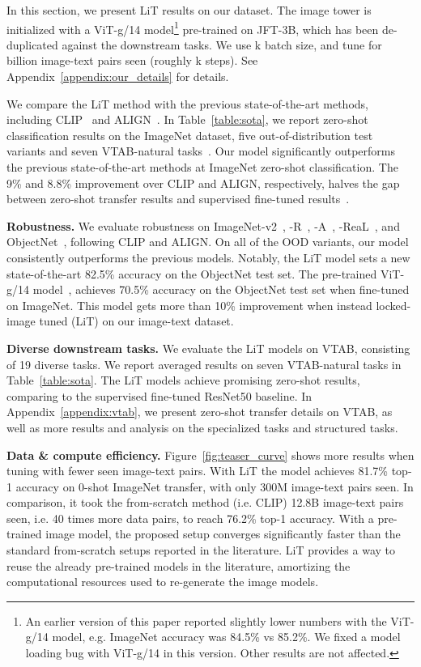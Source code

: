 \documentclass[10pt,twocolumn,letterpaper]{article}
\makeatletter
\def \lit {LiT\xspace}
\renewcommand*{\ie}{i.e.\@\xspace}
\def\objsota{82.5}
\makeatother
\begin{document}
In this section, we present \lit{} results on our dataset.
The image tower is initialized with a ViT-g/14 model\footnote{An earlier version of this paper reported slightly lower numbers with the ViT-g/14 model, e.g. ImageNet accuracy was 84.5\% vs 85.2\%. We fixed a model loading bug with ViT-g/14 in this version. Other results are not affected.} pre-trained on JFT-3B\cite{vitg}, which has been de-duplicated against the downstream tasks. 
We use k batch size, and tune for  billion image-text pairs seen (roughly k steps). See Appendix~\ref{appendix:our_details} for details.

We compare the LiT method with the previous state-of-the-art methods, including CLIP~\cite{clip} and ALIGN~\cite{align}. 
In Table~\ref{table:sota}, we report zero-shot classification results on the ImageNet dataset, five out-of-distribution test variants and seven VTAB-natural tasks~\cite{vtab}.
Our model significantly outperforms the previous state-of-the-art methods at ImageNet zero-shot classification.
The 9\% and  8.8\% improvement over CLIP and ALIGN, respectively, halves the gap between zero-shot transfer results and supervised fine-tuned results~\cite{vitg,coatnet}.

\textbf{Robustness.}
We evaluate robustness on ImageNet-v2~\cite{imagenet_v2}, -R~\cite{imagenet_r,imagenet_sketch}, -A~\cite{imagenet_a}, -ReaL~\cite{imagenet_real}, and ObjectNet~\cite{objectnet}, following CLIP and ALIGN. 
On all of the OOD variants, our model consistently outperforms the previous models. 
Notably, the \lit{} model sets a new state-of-the-art \objsota{}\% accuracy on the ObjectNet test set.
The pre-trained ViT-g/14 model~\cite{vitg}, achieves 70.5\% accuracy on the ObjectNet test set when fine-tuned on ImageNet.
This model gets more than 10\% improvement when instead locked-image tuned (LiT) on our image-text dataset.

\textbf{Diverse downstream tasks.}
We evaluate the LiT models on VTAB, consisting of 19 diverse tasks.
We report averaged results on seven VTAB-natural tasks in Table~\ref{table:sota}. The LiT models achieve promising zero-shot results, comparing to the supervised fine-tuned ResNet50 baseline. 
In Appendix~\ref{appendix:vtab}, we present zero-shot transfer details on VTAB, as well as more results and analysis on the specialized tasks and structured tasks.

\textbf{Data \& compute efficiency.} Figure~\ref{fig:teaser_curve} shows more results when tuning with fewer seen image-text pairs. 
With \lit{} the model achieves 81.7\% top-1 accuracy on 0-shot ImageNet transfer, with only 300M image-text pairs seen.
In comparison, it took the from-scratch method (\ie CLIP) 12.8B image-text pairs seen, \ie 40 times more data pairs, to reach 76.2\% top-1 accuracy. 
With a pre-trained image model, the proposed setup converges significantly faster than the standard from-scratch setups reported in the literature.
\lit{} provides a way to reuse the already pre-trained models in the literature, amortizing the computational resources used to re-generate the image models.
\end{document}
